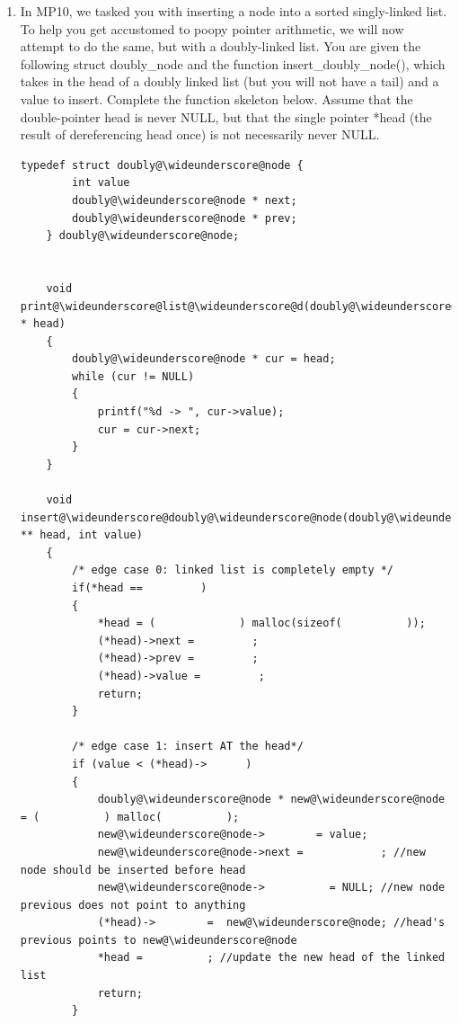 \documentclass{article}
\begin{document}
\begin{enumerate}[label=(\alph*), itemsep = 120pt]
\begin{lstlisting}[style=CStyle]
int main () {
    Student all_students[5];
    // Load data into all students:
    load_students(all@\wideunderscore@students, 5);
    // Find the student with the highest GPA:
    Student* best@\wideunderscore@student = 
    find@\wideunderscore@best(all@\wideunderscore@students, 5,         );
    printf("Best GPA:%f\n",         );
}

void find@\wideunderscore@best(Student* all, int num@\wideunderscore@students, Student** best) {
    for (int i = 0; i < num@\wideunderscore@students; i++) {
        if (all[i].GPA >        ) {
            // Fill:
        }
    }
}

\end{lstlisting}

\item In MP10, we tasked you with inserting a node into a sorted singly-linked list. To help you get accustomed to poopy pointer arithmetic, we will now attempt to do the same, but with a doubly-linked list. You are given the following struct doubly\_node and the function insert\_doubly\_node(), which takes in the head of a doubly linked list (but you will not have a tail) and a value to insert. Complete the function skeleton below. Assume that the double-pointer head is never NULL, but that the single pointer *head (the result of dereferencing head once) is not necessarily never NULL.

\begin{lstlisting}[style = CStyle]
    typedef struct doubly@\wideunderscore@node {
        int value
        doubly@\wideunderscore@node * next;
        doubly@\wideunderscore@node * prev;
    } doubly@\wideunderscore@node;


    void print@\wideunderscore@list@\wideunderscore@d(doubly@\wideunderscore@node * head)
    {
        doubly@\wideunderscore@node * cur = head;
        while (cur != NULL)
        {
            printf("%d -> ", cur->value);
            cur = cur->next;
        }
    }

    void insert@\wideunderscore@doubly@\wideunderscore@node(doubly@\wideunderscore@node ** head, int value) 
    {
        /* edge case 0: linked list is completely empty */
        if(*head ==         ) 
        {
            *head = (             ) malloc(sizeof(          ));
            (*head)->next =         ;
            (*head)->prev =         ;
            (*head)->value =         ;
            return;
        }

        /* edge case 1: insert AT the head*/
        if (value < (*head)->      )
        {
            doubly@\wideunderscore@node * new@\wideunderscore@node = (          ) malloc(          );
            new@\wideunderscore@node->        = value;
            new@\wideunderscore@node->next =            ; //new node should be inserted before head
            new@\wideunderscore@node->          = NULL; //new node previous does not point to anything
            (*head)->        =  new@\wideunderscore@node; //head's previous points to new@\wideunderscore@node
            *head =          ; //update the new head of the linked list
            return;
        }


\end{lstlisting}
\end{enumerate}
\end{document}
